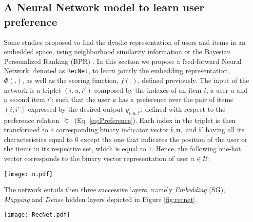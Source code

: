 \documentclass[10pt,journal,compsoc]{IEEEtran}
\newcommand{\userS}{\mathcal{U}}
\newcommand{\RecNet}{\texttt{RecNet}}
\newcommand{\prefu}{\renewcommand\arraystretch{.2} \begin{array}{c}
   {\succ} \\  \mbox{{\tiny {\it u}}}
  \end{array}\renewcommand\arraystretch{1ex}}
\begin{document}
\begin{sloppypar}
\subsection{A Neural Network model to learn user preference}
\label{sec:RecNetModel}
Some studies proposed to find the dyadic representation of users and items in an embedded space, using neighborhood similarity information \cite{Volkovs:2015} or the Bayesian Personalized Ranking (BPR) \cite{rendle_09}. In this section we propose a feed-forward Neural Network, denoted as {\RecNet}, to learn jointly the embedding representation, $\Phi(.)$, as well as the scoring function, $f(.)$, defined previously. The input of the network is a triplet $(i,u,i')$ composed by the indexes of an item $i$, a user $u$ and a second item $i'$; such that the user $u$ has a preference over the pair of items $(i, i')$ expressed by the desired output $y_{i,u,i'}$, defined with respect to the preference relation $\!\prefu\!$ (Eq. \ref{eq:Preference}). Each index in the triplet is then transformed to a corresponding binary indicator vector $\mathbf{i}, \mathbf{u},$ and $\mathbf{i}'$ having all its characteristics equal to $0$ except the one that indicates the position of the user or the items in its respective set, which is equal to $1$. Hence, the following one-hot vector corresponds to the binary vector representation of user $u\in\userS$:
\begin{center}
\texttt{[image: u.pdf]}
\end{center}
\bigskip



The network entails then three successive layers, namely {\it Embedding} (SG), {\it Mapping} and {\it Dense} hidden layers depicted in Figure  \ref{fig:recnet}.

\begin{figure*}[!ht]
\begin{center}
\texttt{[image: RecNet.pdf]}
%
\end{center}\vspace{-5mm}
\caption{The architecture of {\RecNet} trained to reflect the preference of a user $u$ over a pair of items $i$ and $i'$. }
\label{fig:recnet}
\end{figure*}


\end{sloppypar}
\end{document}
